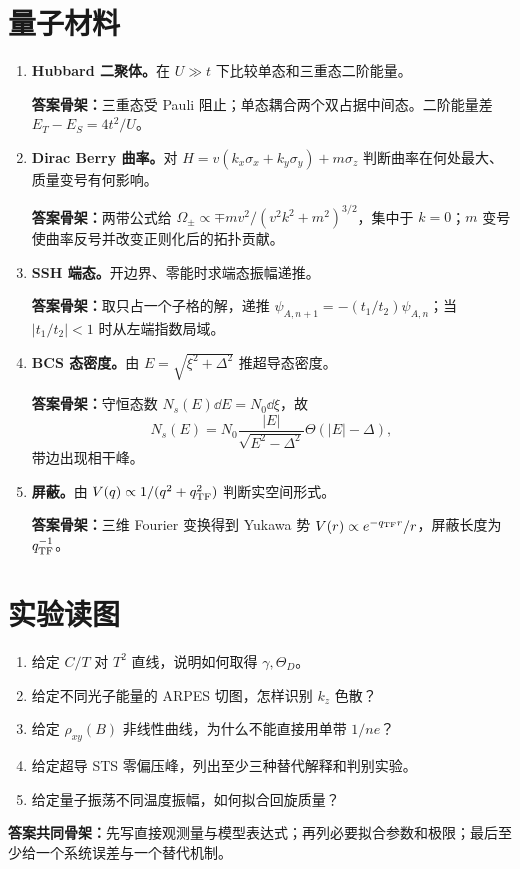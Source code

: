 \section{量子材料}
\begin{enumerate}
\item \textbf{Hubbard 二聚体。}在 $U\gg t$ 下比较单态和三重态二阶能量。

\textbf{答案骨架：}三重态受 Pauli 阻止；单态耦合两个双占据中间态。二阶能量差
$E_T-E_S=4t^2/U$。

\item \textbf{Dirac Berry 曲率。}对
$H=v(k_x\sigma_x+k_y\sigma_y)+m\sigma_z$ 判断曲率在何处最大、质量变号有何影响。

\textbf{答案骨架：}两带公式给
$\Omega_\pm\propto\mp mv^2/(v^2k^2+m^2)^{3/2}$，集中于
$k=0$；$m$ 变号使曲率反号并改变正则化后的拓扑贡献。

\item \textbf{SSH 端态。}开边界、零能时求端态振幅递推。

\textbf{答案骨架：}取只占一个子格的解，递推
$\psi_{A,n+1}=-(t_1/t_2)\psi_{A,n}$；当
$|t_1/t_2|<1$ 时从左端指数局域。

\item \textbf{BCS 态密度。}由
$E=\sqrt{\xi^2+\Delta^2}$ 推超导态密度。

\textbf{答案骨架：}守恒态数
$N_s(E)\dd E=N_0\dd\xi$，故
\[
N_s(E)=N_0\frac{|E|}{\sqrt{E^2-\Delta^2}}
\Theta(|E|-\Delta),
\]
带边出现相干峰。

\item \textbf{屏蔽。}由
$V(q)\propto1/(q^2+q_{\rm TF}^2)$ 判断实空间形式。

\textbf{答案骨架：}三维 Fourier 变换得到 Yukawa 势
$V(r)\propto e^{-q_{\rm TF}r}/r$，屏蔽长度为
$q_{\rm TF}^{-1}$。
\end{enumerate}

\section{实验读图}
\begin{enumerate}
\item 给定 $C/T$ 对 $T^2$ 直线，说明如何取得 $\gamma,\Theta_D$。
\item 给定不同光子能量的 ARPES 切图，怎样识别 $k_z$ 色散？
\item 给定 $\rho_{xy}(B)$ 非线性曲线，为什么不能直接用单带 $1/ne$？
\item 给定超导 STS 零偏压峰，列出至少三种替代解释和判别实验。
\item 给定量子振荡不同温度振幅，如何拟合回旋质量？
\end{enumerate}
\textbf{答案共同骨架：}先写直接观测量与模型表达式；再列必要拟合参数和极限；最后至少给一个系统误差与一个替代机制。

